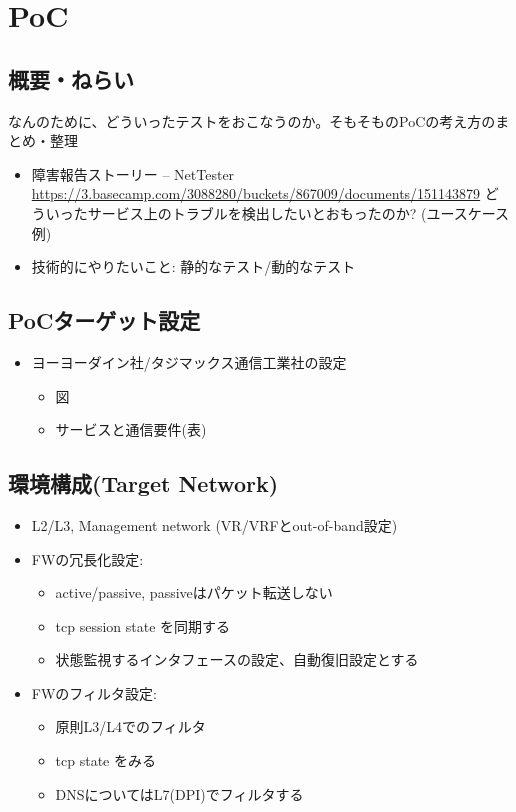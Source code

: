 
\chapter{PoC}
\label{chap:poc}

\section{概要・ねらい}

なんのために、どういったテストをおこなうのか。そもそものPoCの考え方のまとめ・整理

\begin{itemize}
 \item 障害報告ストーリー – NetTester \url{https://3.basecamp.com/3088280/buckets/867009/documents/151143879}
       どういったサービス上のトラブルを検出したいとおもったのか? (ユースケース例)
 \item 技術的にやりたいこと:  静的なテスト/動的なテスト
\end{itemize}

\section{PoCターゲット設定}

 \begin{itemize}
  \item ヨーヨーダイン社/タジマックス通信工業社の設定
        \begin{itemize}
         \item 図
         \item サービスと通信要件(表)
        \end{itemize}
 \end{itemize}

\section{環境構成(Target Network)}

\begin{itemize}
 \item L2/L3, Management network (VR/VRFとout-of-band設定)
 \item FWの冗長化設定:
       \begin{itemize}
        \item active/passive, passiveはパケット転送しない
        \item tcp session state を同期する
        \item 状態監視するインタフェースの設定、自動復旧設定とする
       \end{itemize}
 \item FWのフィルタ設定:
       \begin{itemize}
        \item 原則L3/L4でのフィルタ
        \item tcp state をみる
        \item DNSについてはL7(DPI)でフィルタする
       \end{itemize}
\end{itemize}

